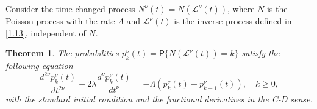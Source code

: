 \documentclass[12pt]{article}
\theoremstyle{definition}
\theoremstyle{plain}
\newtheorem{theorem}{Theorem}
\newcommand{\Prob}{\mathsf{P}}
\begin{document}
Consider the time-changed process $N^\nu(t)=N(\mathcal{L}^\nu(t))$, where $N$ is the Poisson process with the rate $\Lambda$ and $\mathcal{L}^\nu(t)$ is the inverse process defined in \eqref{1.13},  independent of $N$.

\begin{theorem}\label{fPequ}
	The probabilities ${p}^\nu_k(t)=\Prob\{N(\mathcal{L}^\nu(t))=k\}$ satisfy the following  equation
	\begin{equation}\label{(3.1)-(3.2)}
		\frac{d^{2\nu} p_k^\nu(t)}{dt^{2\nu}} + 2\lambda \frac{d^\nu p_k^\nu(t)}{dt^\nu} = -\Lambda\left(p_k^\nu(t) - p_{k-1}^\nu(t)\right), \quad k \ge 0,
	\end{equation}
	with the standard initial condition and the  fractional derivatives in the C-D sense.
\end{theorem}
\end{document}
